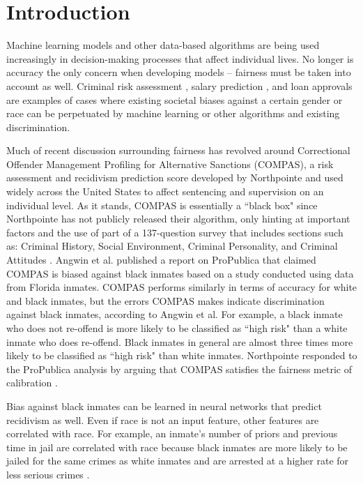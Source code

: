 \documentclass{article}
\begin{document}
\section{Introduction}
\label{introduction}
\vspace{-2mm}

Machine learning models and other data-based algorithms are being used increasingly in decision-making processes that affect individual lives. No longer is accuracy the only concern when developing models -- fairness must be taken into account as well. Criminal risk assessment \cite{Angwin1}, salary prediction \cite{BBC}, and loan approvals \cite{Swarns} are examples of cases where existing societal biases against a certain gender or race can be perpetuated by machine learning or other algorithms and existing discrimination.

Much of recent discussion surrounding fairness has revolved around Correctional Offender Management Profiling for Alternative Sanctions (COMPAS), a risk assessment and recidivism prediction score developed by Northpointe and used widely across the United States to affect sentencing and supervision on an individual level. As it stands, COMPAS is essentially a ``black box" since Northpointe has not publicly released their algorithm, only hinting at important factors and the use of part of a 137-question survey that includes sections such as: Criminal History, Social Environment, Criminal Personality, and Criminal Attitudes \cite{Angwin1}. Angwin et al.  published a report on ProPublica that claimed COMPAS is biased against black inmates based on a study conducted using data from Florida inmates. COMPAS performs similarly in terms of accuracy for white and black inmates, but the errors COMPAS makes indicate discrimination against black inmates, according to Angwin et al. For example, a black inmate who does not re-offend is more likely to be classified as ``high risk" than a white inmate who does re-offend. Black inmates in general are almost three times more likely to be classified as ``high risk" than white inmates. Northpointe responded to the ProPublica analysis by arguing that COMPAS satisfies the fairness metric of calibration \cite{Equivant}.

Bias against black inmates can be learned in neural networks that predict recidivism as well. Even if race is not an input feature, other features are correlated with race. For example, an inmate's number of priors and previous time in jail are correlated with race because black inmates are more likely to be jailed for the same crimes as white inmates and are arrested at a higher rate for less serious crimes \cite{Williams, Fenton}.
\end{document}
